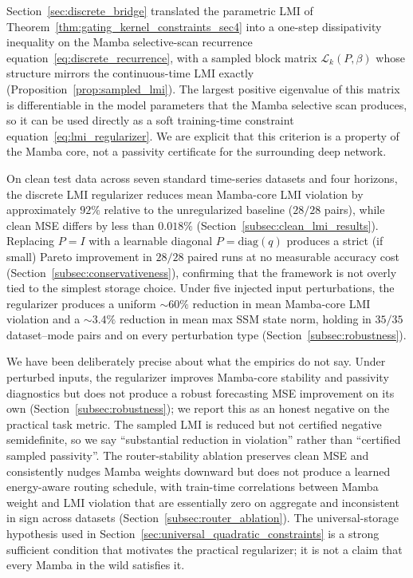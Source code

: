 \documentclass[10pt]{article} %
\def\eqref#1{equation~\ref{#1}}
\theoremstyle{definition}
\begin{document}
Section~\ref{sec:discrete_bridge} translated the parametric LMI of Theorem~\ref{thm:gating_kernel_constraints_sec4} into a one-step dissipativity inequality on the Mamba selective-scan recurrence \eqref{eq:discrete_recurrence}, with a sampled block matrix $\mathcal{L}_k(P,\beta)$ whose structure mirrors the continuous-time LMI exactly (Proposition~\ref{prop:sampled_lmi}). The largest positive eigenvalue of this matrix is differentiable in the model parameters that the Mamba selective scan produces, so it can be used directly as a soft training-time constraint \eqref{eq:lmi_regularizer}. We are explicit that this criterion is a property of the Mamba core, not a passivity certificate for the surrounding deep network.

On clean test data across seven standard time-series datasets and four horizons, the discrete LMI regularizer reduces mean Mamba-core LMI violation by approximately $92\%$ relative to the unregularized baseline ($28/28$ pairs), while clean MSE differs by less than $0.018\%$ (Section~\ref{subsec:clean_lmi_results}). Replacing $P=I$ with a learnable diagonal $P=\mathrm{diag}(q)$ produces a strict (if small) Pareto improvement in $28/28$ paired runs at no measurable accuracy cost (Section~\ref{subsec:conservativeness}), confirming that the framework is not overly tied to the simplest storage choice. Under five injected input perturbations, the regularizer produces a uniform $\sim 60\%$ reduction in mean Mamba-core LMI violation and a $\sim 3.4\%$ reduction in mean max SSM state norm, holding in $35/35$ dataset--mode pairs and on every perturbation type (Section~\ref{subsec:robustness}).

We have been deliberately precise about what the empirics do not say. Under perturbed inputs, the regularizer improves Mamba-core stability and passivity diagnostics but does not produce a robust forecasting MSE improvement on its own (Section~\ref{subsec:robustness}); we report this as an honest negative on the practical task metric. The sampled LMI is reduced but not certified negative semidefinite, so we say ``substantial reduction in violation'' rather than ``certified sampled passivity''. The router-stability ablation preserves clean MSE and consistently nudges Mamba weights downward but does not produce a learned energy-aware routing schedule, with train-time correlations between Mamba weight and LMI violation that are essentially zero on aggregate and inconsistent in sign across datasets (Section~\ref{subsec:router_ablation}). The universal-storage hypothesis used in Section~\ref{sec:universal_quadratic_constraints} is a strong sufficient condition that motivates the practical regularizer; it is not a claim that every Mamba in the wild satisfies it.
\end{document}
